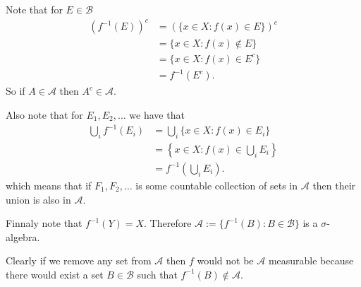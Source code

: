 \documentclass{unswmaths}
\begin{document}
\section{}
\subsection{}
Note that for $ E \in \mathcal{B} $
\begin{align}
    \left(f^{-1}(E)\right)^c &= \left(\{ x \in X : f(x) \in E \}\right)^c \\
    &= \{ x \in X : f(x) \not\in E \} \\
    &= \{ x \in X : f(x) \in E^c \} \\
    &= f^{-1}(E^c).
\end{align}
So if $ A \in \mathcal{A} $ then $ A^c \in \mathcal{A} $.

Also note that for $ E_1, E_2, \ldots $ 
we have that
\begin{align*}
    \bigcup_{i} f^{-1}(E_i) &= \bigcup_{i} \{ x \in X : f(x) \in E_i \} \\
        &= \left\{ x \in X : f(x) \in \bigcup_i E_i \right\} \\
        &= f^{-1}\left(\bigcup_i E_i \right).
\end{align*}
which means that if $ F_1, F_2, \ldots $ is some countable collection of sets in $ \mathcal{A} $ then their union is also in $ \mathcal{A} $.

Finnaly note that $ f^{-1}(Y) = X $. Therefore $ \mathcal{A} := \{ f^{-1}(B) : B \in \mathcal{B} \} $ is a $ \sigma$-algebra. 

Clearly if we remove any set from $ \mathcal{A} $ then $ f $ would not be $ \mathcal{A} $ measurable because there would exist a set $ B \in \mathcal{B} $ such that $ f^{-1}(B) \not\in \mathcal{A} $. 
\end{document}
